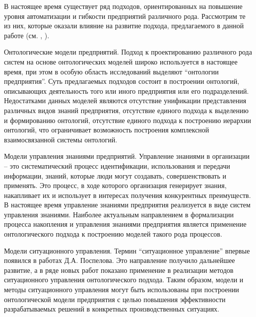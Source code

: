 В настоящее время существует ряд подходов, ориентированных на повышение уровня автоматизации и гибкости предприятий различного рода. Рассмотрим те из них, которые оказали влияние на развитие подхода, предлагаемого в данной работе (см. , ).
\begin{textitemize}
    \item Онтологические модели предприятий. Подход к проектированию различного рода систем на основе онтологических моделей широко используется в настоящее время, при этом в особую область исследований выделяют ``онтологии предприятия''. Суть предлагаемых подходов состоит в построении онтологий, описывающих деятельность того или иного предприятия или его подразделений. Недостатками данных моделей являются отсутствие унификации представления различных видов знаний предприятия, отсутствие единого подхода к выделению и формированию онтологий, отсутствие единого подхода к построению иерархии онтологий, что ограничивает возможность построения комплексной взаимосвязанной системы онтологий.
    \item Модели управления знаниями предприятий. Управление знаниями в организации – это систематический процесс идентификации, использования и передачи информации, знаний, которые люди могут создавать, совершенствовать и применять. Это процесс, в ходе которого организация генерирует знания, накапливает их и использует в интересах получения конкурентных преимуществ. В настоящее время управление знаниями предприятия реализуется в виде систем управления знаниями. Наиболее актуальным направлением в формализации процесса накопления и управления знаниями предприятия является применение онтологического подхода к построению моделей такого рода процессов.
    \item Модели ситуационного управления. Термин ``ситуационное управление'' впервые появился в работах Д.А. Поспелова. Это направление получило дальнейшее развитие, а в ряде новых работ показано применение в реализации методов ситуационного управления онтологического подхода. Таким образом, модели и методы ситуационного управления могут быть использованы при построении онтологической модели предприятия с целью повышения эффективности разрабатываемых решений в конкретных производственных ситуациях.

\end{textitemize}
